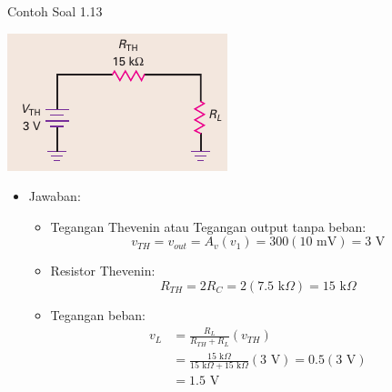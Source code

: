 \documentclass[aspectratio=169]{beamer}
\begin{document}
\begin{frame}{Contoh Soal 1.13}
	\begin{multicols}{2}
		\begin{center}
			\includegraphics[height=0.3\textheight]{gambar/01.fig32b}
		\end{center}
		
		\begin{itemize}
			\item Jawaban:
			\begin{itemize}
				\item Tegangan Thevenin atau Tegangan output tanpa beban:
				\[ v_{TH} = v_{out} = A_v(v_1) = 300 (10 \text{ mV}) = 3 \text{ V} \]
				\item Resistor Thevenin:
				\[ R_{TH} = 2R_C = 2(7.5 \text{ k}\Omega) = 15 \text{ k}\Omega \]
				\item Tegangan beban:
				\begin{align*}
					v_L &= \frac{R_L}{R_{TH} + R_L}(v_{TH}) \\
					&= \frac{15 \text{ k}\Omega}{15 \text{ k}\Omega + 15 \text{ k}\Omega}(3 \text{ V}) = 0.5(3 \text{ V}) \\
					&= 1.5 \text{ V}
				\end{align*}
			\end{itemize}
		\end{itemize}
		\vfill\null
	\end{multicols}
\end{frame}
\end{document}
